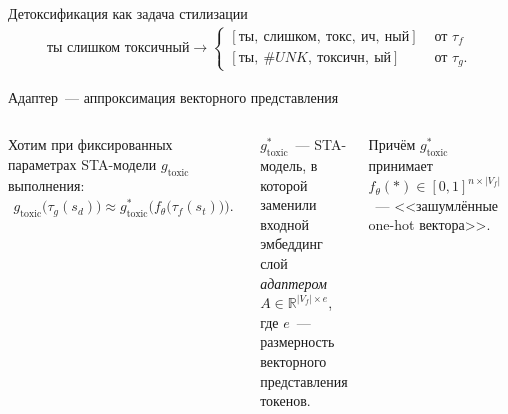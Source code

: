 \documentclass[12pt, fleqn, xcolor=x11names, xcolor=table, aspectratio=169]{beamer}
\begin{document}
\begin{frame}{Детоксификация как задача стилизации}
\begin{gather*}
    \textit{ты слишком токсичный} \longrightarrow
    \begin{cases} 
        [\textit{ты},\ \textit{слишком},\ \textit{токс},\ \textit{ич},\ \textit{ный}] &\text{ от } \tau_{f}\\
        [\textit{ты},\ \textit{\#UNK},\ \textit{токсичн},\ \textit{ый}] &\text{ от } \tau_{g}.
    \end{cases}
\end{gather*}

\end{frame}


\begin{frame}{Адаптер~--- аппроксимация векторного представления}

\begin{columns}[c]

Хотим при фиксированных параметрах STA-модели $g_{\text{toxic}}$ выполнения:
\begin{gather*}
    g_{\text{toxic}}\bigl(\tau_{g}(s_d) \bigr) \approx 
    g^{*}_{\text{toxic}} \bigl(f_{\theta} \bigl(\tau_{f}(s_t)\bigr) \bigr).
\end{gather*}

\vfill

$g^{*}_{\text{toxic}}$~--- STA-модель, в которой заменили входной эмбеддинг слой  \textit{адаптером} $A \in \mathbb{R}^{|V_f| \times e}$,
где $e$~--- размерность векторного представления токенов.

\vfill

Причём $g^{*}_{\text{toxic}}$ принимает $f_{\theta}(*) \in [0, 1]^{n \times |V_f|}$~--- <<зашумлённые one-hot вектора>>.

\includegraphics[width=1.2\textwidth, left]{images/non_diff_loss.pdf}
\end{columns} 
\end{frame}
\end{document}
